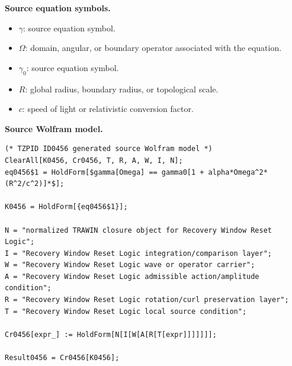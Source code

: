 \begin{minipage}[t]{0.49\linewidth}
\begingroup
\small
\raggedright
\textbf{Source equation symbols.}\par
\begin{itemize}[leftmargin=1.35em,itemsep=1pt,topsep=1pt,parsep=0pt]
    \item $\gamma$: source equation symbol.
    \item $\Omega$: domain, angular, or boundary operator associated with the equation.
    \item $\gamma_0$: source equation symbol.
    \item $R$: global radius, boundary radius, or topological scale.
    \item $c$: speed of light or relativistic conversion factor.
\end{itemize}
\endgroup
\end{minipage}\hfill
\begin{minipage}[t]{0.47\linewidth}
\begingroup
\scriptsize
\raggedright
\textbf{Source Wolfram model.}\par
\begin{Verbatim}[fontsize=\tiny,breaklines=true,breakanywhere=true]
(* TZPID ID0456 generated source Wolfram model *)
ClearAll[K0456, Cr0456, T, R, A, W, I, N];
eq0456$1 = HoldForm[$gamma[Omega] == gamma0[1 + alpha*Omega^2*(R^2/c^2)]*$];

K0456 = HoldForm[{eq0456$1}];

N = "normalized TRAWIN closure object for Recovery Window Reset Logic";
I = "Recovery Window Reset Logic integration/comparison layer";
W = "Recovery Window Reset Logic wave or operator carrier";
A = "Recovery Window Reset Logic admissible action/amplitude condition";
R = "Recovery Window Reset Logic rotation/curl preservation layer";
T = "Recovery Window Reset Logic local source condition";

Cr0456[expr_] := HoldForm[N[I[W[A[R[T[expr]]]]]]];

Result0456 = Cr0456[K0456];
\end{Verbatim}
\endgroup
\end{minipage}

